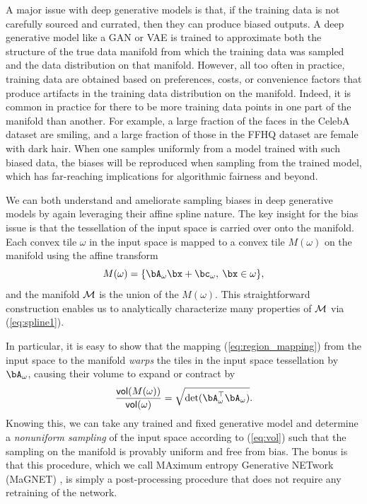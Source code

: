 \documentclass{notices}
\begin{document}
A major issue with deep generative models is that, if the training data is not carefully sourced and currated, then they can produce biased outputs.
A deep generative model like a GAN or VAE is trained to approximate both the structure of the true data manifold from which the training data was sampled and the data distribution on that manifold. 
However, all too often in practice, training data are obtained based on preferences, costs, or convenience factors that produce artifacts in the training data distribution on the manifold.
Indeed, it is common in practice for there to be more training data points in one part of the manifold than another.
For example, a large fraction of the faces in the CelebA dataset are smiling, and a large fraction of those in the FFHQ dataset are female with dark hair.
When one samples uniformly from a model trained with such biased data, the biases %
will be reproduced when sampling from the trained model, which has far-reaching implications for algorithmic fairness and beyond.


We can both understand and ameliorate sampling biases in deep generative models by again leveraging their affine spline nature.
The key insight for the bias issue is that the tessellation of the input space is carried over onto the manifold.
Each convex tile $\omega$ in the input space is mapped to a convex tile $M(\omega)$ on the manifold using the affine transform %
\begin{equation} 
    M(\omega) = \{\bA_{\omega} \bx + \bc_{\omega}, \: \bx \in \omega \},
    \label{eq:region_mapping}
\end{equation}
and the manifold ${\cal M}$ is the union of the $M(\omega)$.
This straightforward construction enables us to analytically characterize many properties of ${\cal M}$ via (\ref{eq:spline1}).


In particular, it is easy to show that the mapping (\ref{eq:region_mapping})  from the input space to the manifold {\em warps} the tiles in the input space tessellation by $\bA_\omega$, causing their volume to expand or contract by 
\begin{equation}
    \frac{{\sf vol}(M(\omega))}{{\sf vol}(\omega)} = \sqrt{\det(\bA_{\omega}^\top \bA_{\omega})}.
    \label{eq:vol}
\end{equation}
Knowing this, we can take any trained and fixed generative model and determine a {\em nonuniform sampling} of the input space according to (\ref{eq:vol}) such that the sampling on the manifold is provably uniform and free from bias.
The bonus is that this procedure, which we call MAximum entropy Generative NETwork (MaGNET) \cite{magnet}, is simply a post-processing procedure that does not require any retraining of the network.
\end{document}
